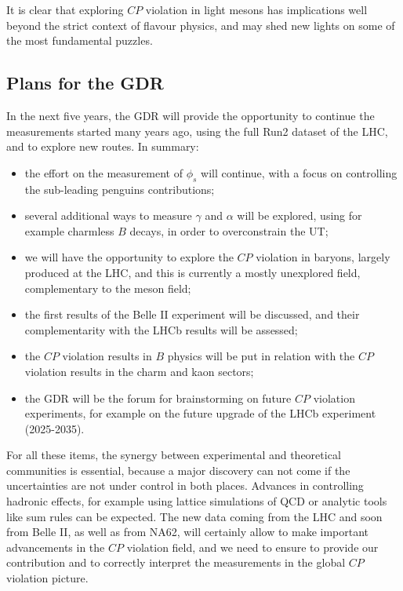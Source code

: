 It is clear that exploring $CP$ violation in light mesons has implications well beyond the
strict context of flavour physics, and may shed new lights on some of the most
fundamental puzzles.





\subsection*{Plans for the GDR}
In the next five years, the GDR   will provide the opportunity to continue the measurements started many years ago, using the full Run2 dataset of the LHC, and to explore new routes.  In summary:
\begin{itemize}
\item the effort on the measurement of $\phi_{s}$ will continue, with a focus on controlling the sub-leading penguins contributions;
\item several additional ways to measure $\gamma$ and $\alpha$ will be explored, using for example charmless $B$ decays, in order  to overconstrain the UT;
\item we will have the opportunity to explore the $CP$ violation in baryons, largely produced at the LHC, and this is currently a mostly unexplored field, complementary to the meson field;
\item  the first results  of the Belle II experiment will be discussed, and  their complementarity with the LHCb results will be assessed;
\item the $CP$ violation results in $B$ physics will be put in relation with the $CP$ violation results in the charm and kaon sectors; 
\item the GDR will be the forum for  brainstorming on future $CP$ violation experiments, for example on the future upgrade of the LHCb experiment (2025-2035).
\end{itemize}

For all these items, the synergy between experimental and theoretical communities is essential, because a major discovery can not come if the uncertainties are not under control in both places. Advances in controlling
hadronic effects, for example using lattice simulations of QCD or analytic 
tools like sum rules can be expected.
 The new data coming from the LHC and soon from Belle II, as well as from NA62, will certainly allow to make important advancements in the $CP$ violation field, and we need to ensure to provide our contribution and to correctly interpret the measurements in the global $CP$ violation picture. 

